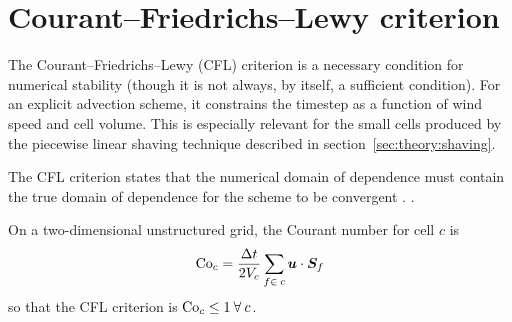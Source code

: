 \section{Courant--Friedrichs--Lewy criterion}
The Courant--Friedrichs--Lewy (CFL) criterion is a necessary condition for numerical stability (though it is not always, by itself, a sufficient condition).  For an explicit advection scheme, it constrains the timestep as a function of wind speed and cell volume.  This is especially relevant for the small cells produced by the piecewise linear shaving technique described in section~\ref{sec:theory:shaving}.

The CFL criterion states that the numerical domain of dependence must contain the true domain of dependence for the scheme to be convergent \autocite{leveque2002}.  .

On a two-dimensional unstructured grid, the Courant number for cell $c$ is \autocite{weller-shahrokhi2014}
\begin{align}
\mathrm{Co}_c = \frac{\Delta t}{2 V_c} \sum_{f \in\: c} \bm{u} \cdot \bm{S}_f \label{eqn:method:courant}
\end{align}
so that the CFL criterion is $\mathrm{Co}_c \leq 1\:\forall\:c$.

